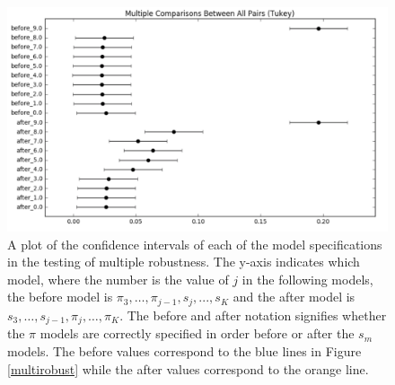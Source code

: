 \begin{figure}[h!]
\includegraphics[width = .9\linewidth]{figures/Tukey.png}
\caption{A plot of the confidence intervals of each of the model specifications in the testing of multiple robustness.  The y-axis indicates which model, where the number is the value of $j$ in the following models, the before model is $\pi_3,\dots, \pi_{j-1},s_j,...,s_K$ and the after model is $s_3, \dots, s_{j-1}, \pi_j, \dots, \pi_K$.  The before and after notation signifies whether the $\pi$ models are correctly specified in order before or after the $s_m$ models.  The before values correspond to the blue lines in Figure \ref{multirobust} while the after values correspond to the orange line.}
\label{Tukey}
\end{figure} 




